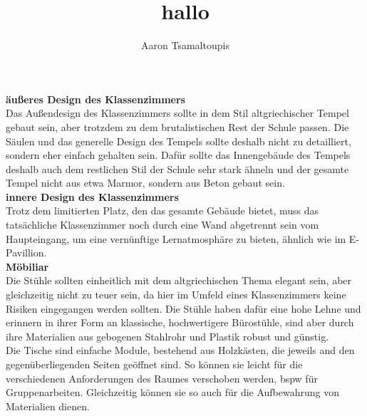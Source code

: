 \documentclass[12pt, letterpaper]{article}
\title{hallo}
\author{Aaron Tsamaltoupis}
\begin{document}
\textbf{äußeres Design des Klassenzimmers}\\ 
Das Außendesign des Klassenzimmers sollte in dem Stil altgriechischer Tempel gebaut sein, aber trotzdem zu dem brutalistischen Rest der Schule passen. Die Säulen und das generelle Design des Tempels sollte deshalb nicht zu detailliert, sondern eher einfach gehalten sein. Dafür sollte das Innengebäude des Tempels deshalb auch dem restlichen Stil der Schule sehr stark ähneln und der gesamte Tempel nicht aus etwa Marmor, sondern aus Beton gebaut sein.\\
\textbf{innere Design des Klassenzimmers}\\ 
Trotz dem limitierten Platz, den das gesamte Gebäude bietet, muss das tatsächliche Klassenzimmer noch durch eine Wand abgetrennt sein vom Haupteingang, um eine vernünftige Lernatmosphäre zu bieten, ähnlich wie im E-Pavillion.\\
\textbf{Möbiliar}\\
Die Stühle sollten einheitlich mit dem altgriechischen Thema elegant sein, aber gleichzeitig nicht zu teuer sein, da hier im Umfeld eines Klassenzimmers keine Risiken eingegangen werden sollten.
Die Stühle haben dafür eine hohe Lehne und erinnern in ihrer Form an klassische, hochwertigere Bürostühle, sind aber durch ihre Materialien aus gebogenen Stahlrohr und Plastik robust und günstig.\\
Die Tische sind einfache Module, bestehend aus Holzkästen, die jeweils and den gegenüberliegenden Seiten geöffnet sind. So können sie leicht für die verschiedenen Anforderungen des Raumes verschoben werden, bspw für Gruppenarbeiten. Gleichzeitig können sie so auch für die Aufbewahrung von Materialien dienen.
\end{document}
